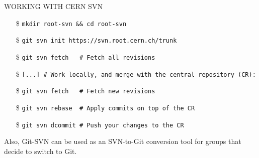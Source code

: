 \documentclass[final,hyperref={pdfpagelabels=false},notitlepage=true]{beamer}
\begin{document}
\begin{frame}{}
\begin{columns}[t]
\begin{column}{0.45\linewidth}
\begin{block}{\large WORKING WITH CERN SVN}
          \vskip1cm
          \begin{itemize}
            \item[\$] {\tt mkdir root-svn \&\& cd root-svn}
            \item[\$] {\tt git svn init https://svn.root.cern.ch/trunk}
            \item[\$] {\tt git svn fetch \ \ \# Fetch all revisions}
              \vskip1cm
            \item[\$] {\tt [...] \# Work locally, and merge with the central repository (CR):}
              \vskip1cm
            \item[\$] {\tt git svn fetch \ \ \# Fetch new revisions}
            \item[\$] {\tt git svn rebase \ \# Apply commits on top of the CR}
            \item[\$] {\tt git svn dcommit \# Push your changes to the CR}
          \end{itemize}

\vspace{1cm}
          Also, Git-SVN {\color{orange} can be used as an SVN-to-Git conversion tool}
          for groups that decide to switch to Git.
	\end{block}

\vspace{2cm}

    \vskip-1.5cm
    \vfill
    \end{column}
    \end{columns}
  \end{frame}
\end{document}
